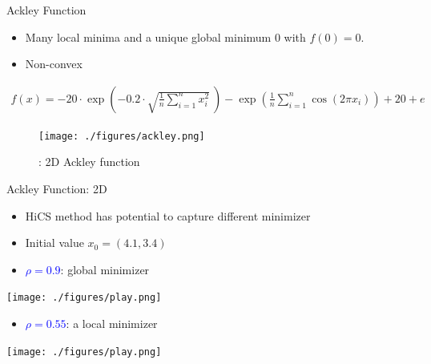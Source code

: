 \documentclass{beamer}
\newcommand{\bmx}{x}
\begin{document}
\begin{frame}{Ackley Function}
\footnotesize{
\begin{itemize}
	\item Many local minima and a unique global
minimum $0$ with $f(0)=0$.
	\item Non-convex
\end{itemize}
\vspace{-0.2cm}
\begin{align*}
	f(\bmx) =
	-20\cdot\exp\left(-0.2\cdot\sqrt{\frac{1}{n}\sum_{i=1}^n
	x_i^2}~\right)-
	\exp\left(\frac{1}{n}\sum_{i=1}^n \cos(2\pi x_i)\right)+20+e
\end{align*}
}
\vspace{-0.4cm}
\begin{figure}[!htbp]
	\centering
	  \texttt{[image: ./figures/ackley.png]}
	  \caption{: 2D Ackley function}
\end{figure}
\end{frame}

\begin{frame}{Ackley Function: 2D}

	\begin{itemize}
		\item HiCS method has potential to capture different minimizer
		\item Initial value $x_0 = (4.1, 3.4)$ 
	\end{itemize}

	\begin{itemize}
		\item \textcolor{blue}{$\rho=0.9$}: global minimizer 
	\end{itemize}
	\begin{center}
		\hspace*{-0.7cm}\texttt{[image: ./figures/play.png]}
	\end{center}

	\begin{itemize}
		\item \textcolor{blue}{$\rho=0.55$}: a local minimizer 
	\end{itemize}
	\begin{center}
		\hspace*{-0.7cm}\texttt{[image: ./figures/play.png]}
	\end{center}
\end{frame}
\end{document}
